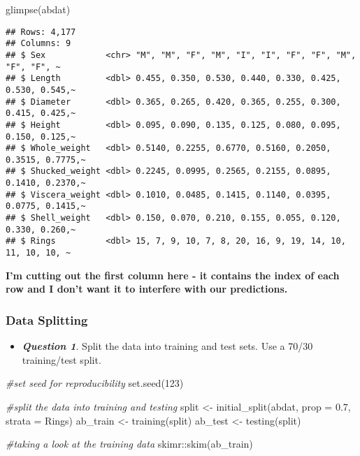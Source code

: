 \documentclass[
]{article}
\newenvironment{Shaded}{\begin{snugshade}}{\end{snugshade}}
\newcommand{\AttributeTok}[1]{\textcolor[rgb]{0.77,0.63,0.00}{#1}}
\newcommand{\CommentTok}[1]{\textcolor[rgb]{0.56,0.35,0.01}{\textit{#1}}}
\newcommand{\DecValTok}[1]{\textcolor[rgb]{0.00,0.00,0.81}{#1}}
\newcommand{\FloatTok}[1]{\textcolor[rgb]{0.00,0.00,0.81}{#1}}
\newcommand{\FunctionTok}[1]{\textcolor[rgb]{0.00,0.00,0.00}{#1}}
\newcommand{\NormalTok}[1]{#1}
\newcommand{\OtherTok}[1]{\textcolor[rgb]{0.56,0.35,0.01}{#1}}
\newcommand{\SpecialCharTok}[1]{\textcolor[rgb]{0.00,0.00,0.00}{#1}}
\providecommand{\tightlist}{%
  \setlength{\itemsep}{0pt}\setlength{\parskip}{0pt}}
\begin{document}
\begin{Shaded}
\begin{Highlighting}[]
\FunctionTok{glimpse}\NormalTok{(abdat)}
\end{Highlighting}
\end{Shaded}

\begin{verbatim}
## Rows: 4,177
## Columns: 9
## $ Sex            <chr> "M", "M", "F", "M", "I", "I", "F", "F", "M", "F", "F", ~
## $ Length         <dbl> 0.455, 0.350, 0.530, 0.440, 0.330, 0.425, 0.530, 0.545,~
## $ Diameter       <dbl> 0.365, 0.265, 0.420, 0.365, 0.255, 0.300, 0.415, 0.425,~
## $ Height         <dbl> 0.095, 0.090, 0.135, 0.125, 0.080, 0.095, 0.150, 0.125,~
## $ Whole_weight   <dbl> 0.5140, 0.2255, 0.6770, 0.5160, 0.2050, 0.3515, 0.7775,~
## $ Shucked_weight <dbl> 0.2245, 0.0995, 0.2565, 0.2155, 0.0895, 0.1410, 0.2370,~
## $ Viscera_weight <dbl> 0.1010, 0.0485, 0.1415, 0.1140, 0.0395, 0.0775, 0.1415,~
## $ Shell_weight   <dbl> 0.150, 0.070, 0.210, 0.155, 0.055, 0.120, 0.330, 0.260,~
## $ Rings          <dbl> 15, 7, 9, 10, 7, 8, 20, 16, 9, 19, 14, 10, 11, 10, 10, ~
\end{verbatim}

\textbf{I'm cutting out the first column here - it contains the index of
each row and I don't want it to interfere with our predictions.}

\hypertarget{data-splitting}{%
\subsubsection{Data Splitting}\label{data-splitting}}

\begin{itemize}
\tightlist
\item
  \textbf{\emph{Question 1}}. Split the data into training and test
  sets. Use a 70/30 training/test split.
\end{itemize}

\begin{Shaded}
\begin{Highlighting}[]
\CommentTok{\#set seed for reproducibility}
\FunctionTok{set.seed}\NormalTok{(}\DecValTok{123}\NormalTok{)}

\CommentTok{\#split the data into training and testing}
\NormalTok{split }\OtherTok{\textless{}{-}} \FunctionTok{initial\_split}\NormalTok{(abdat, }\AttributeTok{prop =} \FloatTok{0.7}\NormalTok{, }\AttributeTok{strata =}\NormalTok{ Rings)}
\NormalTok{ab\_train }\OtherTok{\textless{}{-}} \FunctionTok{training}\NormalTok{(split)}
\NormalTok{ab\_test }\OtherTok{\textless{}{-}} \FunctionTok{testing}\NormalTok{(split)}

\CommentTok{\#taking a look at the training data}
\NormalTok{skimr}\SpecialCharTok{::}\FunctionTok{skim}\NormalTok{(ab\_train)}
\end{Highlighting}
\end{Shaded}
\end{document}
